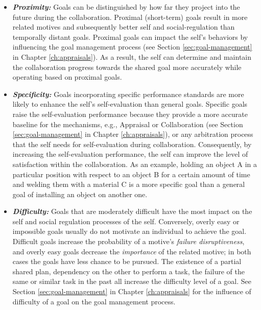 \documentclass[12pt]{report}
\begin{document}
\begin{itemize}
  \item \textbf{\textit{Proximity:}} Goals can be distinguished by how far they
  project into the future during the collaboration. Proximal (short-term) goals
  result in more related motives and subsequently better self and
  social-regulation than temporally distant goals. Proximal goals can impact
  the self's behaviors by influencing the goal management process (see Section
  \ref{sec:goal-management} in Chapter \ref{ch:appraisals}). As a result, the
  self can determine and maintain the collaboration progress towards the shared
  goal more accurately while operating based on proximal goals.
  
  \item \textbf{\textit{Specificity:}} Goals incorporating specific performance
  standards are more likely to enhance the self's self-evaluation than general
  goals. Specific goals raise the self-evaluation performance because they
  provide a more accurate baseline for the mechanisms, e.g., Appraisal or
  Collaboration (see Section \ref{sec:goal-management} in Chapter
  \ref{ch:appraisals}), or any arbitration process that the self needs for
  self-evaluation during collaboration. Consequently, by increasing the
  self-evaluation performance, the self can improve the level of satisfaction
  within the collaboration. As an example, holding an object A in a particular
  position with respect to an object B for a certain amount of time and welding
  them with a material C is a more specific goal than a general goal of
  installing an object on another one.
  
  \item \textbf{\textit{Difficulty:}} Goals that are moderately difficult have
  the most impact on the self and social regulation processes of the self.
  Conversely, overly easy or impossible goals usually do not motivate an
  individual to achieve the goal. Difficult goals increase the probability of a
  motive's \textit{failure disruptiveness}, and overly easy goals decrease the
  \textit{importance} of the related motive; in both cases the goals have less
  chance to be pursued. The existence of a partial shared plan, dependency on
  the other to perform a task, the failure of the same or similar task in the
  past all increase the difficulty level of a goal. See Section
  \ref{sec:goal-management} in Chapter \ref{ch:appraisals} for the influence of
  difficulty of a goal on the goal management process.
\end{itemize}
\end{document}
